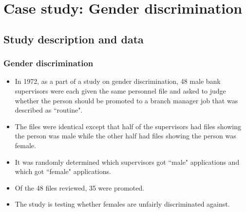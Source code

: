 
\section{Case study: Gender discrimination}


\subsection{Study description and data}


\begin{frame}
\frametitle{Gender discrimination}

\begin{itemize}

\item In 1972, as a part of a study on gender discrimination, 48 male bank supervisors were each given the same personnel file and asked to judge whether the person should be promoted to a branch manager job that was described as ``routine". 

\item The files were identical except that half of the supervisors had files showing the person was male while the other half had files showing the person was female.

\item It was randomly determined which supervisors got ``male" applications and which got ``female" applications.  

\item Of the 48 files reviewed, 35 were promoted. 

\item The study is testing whether females are unfairly discriminated against.  
\end{itemize}

 


\end{frame}



